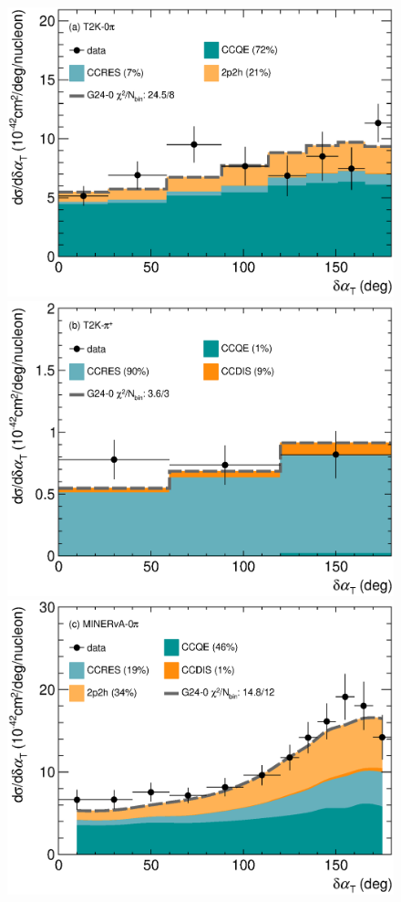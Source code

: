 \begin{figure} 
    \centering 		
    \includegraphics[width=\dbfigwid\textwidth]{figures/0000-t2k_0pi_dalphat_reac_decomp.eps} 
    \includegraphics[width=\dbfigwid\textwidth]{figures/0000-t2k_pip_dalphat_reac_decomp.eps} 
    \includegraphics[width=\dbfigwid\textwidth]{figures/0000-min_0pi_dalphat_reac_decomp.eps} 

\end{figure}
